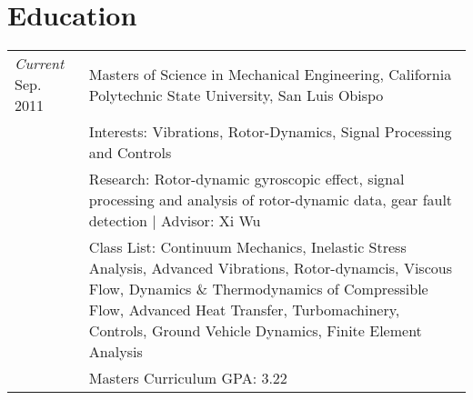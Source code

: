 \documentclass[10pt]{article} %
\begin{document}

\section{Education}

	\begin{tabular}{p{.6in}|p{5.5in}}	
		\emph{Current} Sep. 2011 & Masters of Science in Mechanical Engineering,  California Polytechnic State University, San Luis Obispo\\
		& \footnotesize{Interests: Vibrations, Rotor-Dynamics, Signal Processing and Controls}\\
		& \footnotesize{Research: Rotor-dynamic gyroscopic effect, signal processing and analysis of rotor-dynamic data, gear fault detection | Advisor: Xi Wu}\\
		& \footnotesize{Class List: Continuum Mechanics, Inelastic Stress Analysis, Advanced Vibrations, Rotor-dynamcis, Viscous Flow, Dynamics \& Thermodynamics of Compressible Flow, Advanced Heat Transfer, Turbomachinery, Controls, Ground Vehicle Dynamics, Finite Element Analysis}\\
		& \footnotesize{Masters Curriculum GPA: 3.22}\\
	\end{tabular}



\end{document}
